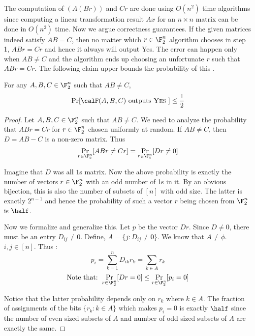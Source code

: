 The computation of $(A(Br))$ and $Cr$ are done using $O(n^2)$ time algorithms since computing a linear transformation result $Ax$ for an $n \times n$ matrix can be done in $O(n^2)$ time. Now we argue correctness guarantees. If the given matrices indeed satisfy $AB = C$, then no matter which $r \in \F_2^n$ algorithm chooses in step 1, $ABr = Cr$ and hence it always will output {\sc Yes}. The error can happen only when $AB \ne C$ and the algorithm ends up choosing an unfortunate $r$ such that $ABr = Cr$. The following claim upper bounds the probability of this .

\begin{claim}
For any $A,B,C \in \F_2^n$ such that $AB \ne C$, 
$$\Pr[\calF(A,B,C)\textrm{ outputs {\sc Yes} }] \le \frac{1}{2} $$
\end{claim}
\begin{proof}
Let $A,B,C \in \F_2^n$ such that $AB \ne C$. We need to analyze the probability that $ABr = Cr$ for $r \in \F_2^n$ chosen uniformly at random. If $AB \ne C$, then $D = AB-C$ is a non-zero matrix.
Thus $$\Pr_{r \in \F_2^n}[ABr \ne Cr] = \Pr_{r \in \F_2^n}[Dr \ne 0]$$

Imagine that $D$ was all $1$s matrix. Now the above probability is exactly the number of vectors $r \in \F_2^n$ with an odd number of 1s in it. By an obvious bijection, this is also the number of subsets of $[n]$ with odd size. The latter is exactly $2^{n-1}$ and hence the probability of such a vector $r$ being chosen from $\F_2^n$ is $\half$. 

Now we formalize and generalize this.
Let $p$ be the vector $Dr$. Since $D \ne 0$, there must be an entry $D_{ij} \ne 0$. Define, $A = \{ j : D_{ij} \ne 0 \}$. We know that $A \ne \phi$. 
$i,j \in [n]$. Thus :
$$p_i = \sum_{k=1}^n D_{ik}r_k = \sum_{k \in A} r_k$$ 
$$\textrm{Note that: } \Pr_{r \in \F_2^n}[Dr = 0] \le \Pr_{r \in \F_2^n}[p_i = 0]$$ 

Notice that the latter probability depends only on $r_k$ where $k \in A$. The fraction of assignments of the bits $\{ r_k : k \in A \}$ which makes $p_i=0$ is exactly $\half$ since the number of even sized subsets of $A$ and number of odd sized subsets of $A$ are exactly the same.
%
\end{proof}
